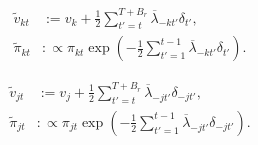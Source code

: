     \begin{align}
        \tilde{v}_{kt} &:= v_k + \frac{1}{2}\sum_{t'=t}^{T+B_r}\overline{\lambda}_{-kt'}\delta_{t'}, \label{eq:mod-v_k} \\
        \tilde{\pi}_{kt} &:\propto \pi_{kt} \exp\left(-\frac{1}{2}\sum_{t'=1}^{t-1}\overline{\lambda}_{-kt'}\delta_{t'}\right).
        \label{eq:mod-pi_k}
    \end{align}

    \begin{align}
        \tilde{v}_{jt} &:= v_j + \frac{1}{2}\sum_{t'=t}^{T+B_r}\overline{\lambda}_{-jt'}\delta_{-jt'}, \label{eq:mod-v_j} \\
        \tilde{\pi}_{jt} &:\propto \pi_{jt} \exp\left(-\frac{1}{2}\sum_{t'=1}^{t-1}\overline{\lambda}_{-jt'}\delta_{-jt'}\right). \label{eq:mod-pi_j}
    \end{align}